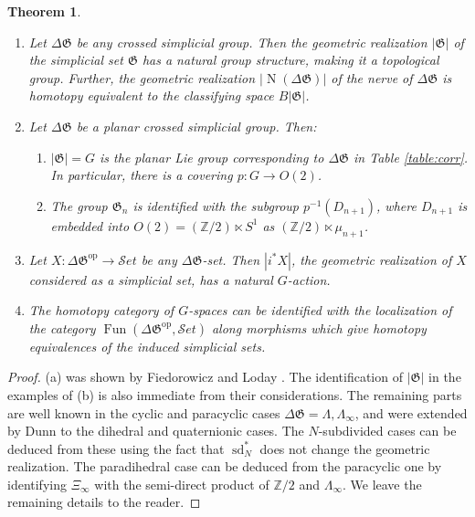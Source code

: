 \documentclass[english,11pt,leqno]{article}
\def\ZZ{\mathbb{Z}}
\def\Gen{\mathfrak{G}}
\def\on{\operatorname}
\def\op{{\operatorname{op}}}
\def\Fun{\operatorname{Fun}}
\def\N{\operatorname{N}}
\def\Set{ {\mathcal Set}}
\def\Set{ {\mathcal Set}}
\newtheorem{thm}{Theorem}[section]
\theoremstyle{definition}
\theoremstyle{remark}
\numberwithin{equation}{section}
\begin{document}
    \begin{thm}\label{thm:crossed-groups}
     \begin{enumerate}
    \item[(a)] Let $\Delta\Gen$ be any crossed simplicial group. Then the geometric realization $|\Gen|$
    of the simplicial set $\Gen$ has a natural group structure, making it a topological group.
    Further, the geometric realization $|\N (\Delta\Gen)|$ of the nerve of $\Delta\Gen$
    is homotopy equivalent to the classifying space $B |\Gen|$. 
    
    \item[(b)]  Let $\Delta\Gen$ be a  planar crossed simplicial group. Then:
    \begin{enumerate}
    \item[(b1)]  $|\Gen|=G$ is the
    planar Lie group corresponding to $\Delta\Gen$ in Table \ref{table:corr}. In particular, there
    is a covering $p: G\to O(2)$. 
    
    \item[(b2)] The group $\Gen_n$ is identified with the subgroup $p^{-1}(D_{n+1})$,
    where $D_{n+1}$ is embedded into $O(2)=(\ZZ/2)\ltimes S^1$ as
    $(\ZZ/2)\ltimes\mu_{n+1}$. 
   \end{enumerate}
    
    \item[(c)] Let $X:\Delta\Gen^\op\to\Set$ be any $\Delta\Gen$-set. Then $|i^*X|$, the geometric
    realization of $X$ considered as a simplicial set, has a natural $G$-action. 
    
    \item[(d)] The homotopy category of $G$-spaces can be identified with the localization 
    of  the category $\Fun(\Delta\Gen^\op, \Set)$ along morphisms which give homotopy equivalences
    of the induced simplicial sets. 
     
    \end{enumerate}
    \end{thm}
    
    \begin{proof} (a)  was shown by Fiedorowicz and Loday \cite{fiedorowicz-loday}.  The identification of
   $|\Gen|$ in the examples of (b) is also immediate from their considerations. The remaining parts
   are well known \cite{DHK} \cite[Ch.7]{loday} in the cyclic and paracyclic cases
    $\Delta \Gen=\Lambda,
   \Lambda_\infty$,
   and were extended by Dunn \cite{dunn} to the dihedral and quaternionic cases. 
   The   $N$-subdivided  cases can be deduced from these using the fact that $\on{sd}_N^*$
   does not change the geometric realization. The paradihedral case can be
   deduced from the paracyclic one by identifying $\Xi_\infty$ with the semi-direct product of
   $\ZZ/2$ and $\Lambda_\infty$. We leave the remaining details to the reader.
\end{proof}
\end{document}
